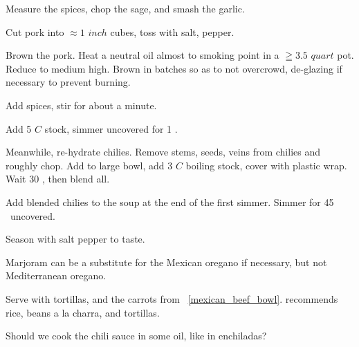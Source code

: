 \begin{preparation}
\item Measure the spices, chop the sage, and smash the garlic.

\item Cut pork into $\approx1$ $inch$ cubes, toss with salt, pepper.

\item Brown the pork.
	Heat a neutral oil almost to smoking point in a $ \geqq 3.5$ $quart$ pot.
	Reduce to medium high.
	Brown in batches so as to not overcrowd, de-glazing if necessary to prevent burning.

\item Add spices, stir for about a minute.

\item Add 5 $C$ stock, simmer uncovered for 1 \hour.

\item Meanwhile, re-hydrate chilies.
	Remove stems, seeds, veins from chilies and roughly chop.
	Add to large bowl, add 3 $C$ boiling stock, cover with plastic wrap.
	Wait 30 \minute, then blend all.

\item Add blended chilies to the soup at the end of the first simmer.
	Simmer for 45 \minute~uncovered.

\item Season with salt pepper to taste.
\end{preparation}


\begin{variation}
\item Marjoram can be a substitute for the Mexican oregano if necessary, but not Mediterranean oregano.

\item Serve with tortillas, and the carrots from ~\ref{mexican_beef_bowl}.  \citeauthor{rMartinez2015} recommends rice, beans a la charra, and tortillas.
\end{variation}


\begin{experiments}
\item Should we cook the chili sauce in some oil, like in enchiladas?
\end{experiments}

\recipeend%

